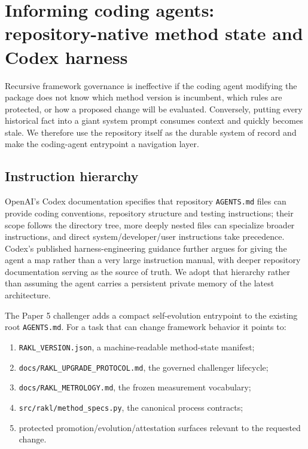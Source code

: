 \section{Informing coding agents: repository-native method state and Codex harness}
\label{sec:codex}

Recursive framework governance is ineffective if the coding agent modifying the package does not know which method version is incumbent, which rules are protected, or how a proposed change will be evaluated. Conversely, putting every historical fact into a giant system prompt consumes context and quickly becomes stale. We therefore use the repository itself as the durable system of record and make the coding-agent entrypoint a navigation layer.

\subsection{Instruction hierarchy}

OpenAI's Codex documentation specifies that repository \texttt{AGENTS.md} files can provide coding conventions, repository structure and testing instructions; their scope follows the directory tree, more deeply nested files can specialize broader instructions, and direct system/developer/user instructions take precedence. Codex's published harness-engineering guidance further argues for giving the agent a map rather than a very large instruction manual, with deeper repository documentation serving as the source of truth. We adopt that hierarchy rather than assuming the agent carries a persistent private memory of the latest \RAKL{} architecture.

The Paper 5 challenger adds a compact self-evolution entrypoint to the existing root \texttt{AGENTS.md}. For a task that can change framework behavior it points to:

\begin{enumerate}[leftmargin=*]
\item \texttt{RAKL\_VERSION.json}, a machine-readable method-state manifest;
\item \texttt{docs/RAKL\_UPGRADE\_PROTOCOL.md}, the governed challenger lifecycle;
\item \texttt{docs/RAKL\_METROLOGY.md}, the frozen measurement vocabulary;
\item \texttt{src/rakl/method\_specs.py}, the canonical process contracts;
\item protected promotion/evolution/attestation surfaces relevant to the requested change.
\end{enumerate}

